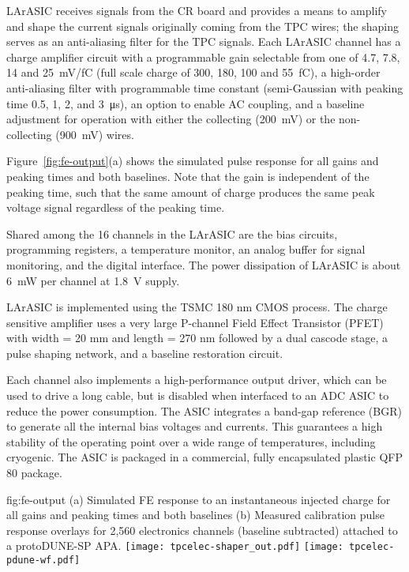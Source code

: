 
LArASIC receives signals from the CR board and
provides a means to amplify and shape the current signals originally coming from the TPC wires; the
shaping serves as an anti-aliasing filter for the TPC signals.
Each LArASIC channel has a charge amplifier circuit with a programmable
gain selectable from one of 4.7, 7.8, 14 and 25~mV/fC
(full scale charge of 300, 180, 100 and 55~fC),
a high-order anti-aliasing filter with programmable time
constant (semi-Gaussian with peaking time 0.5, 1, 2, and 3~\si{\micro\second}),
an option to enable AC coupling,
and a baseline adjustment for operation with either the collecting (200~mV) or the non-collecting (900~mV) wires.

Figure~\ref{fig:fe-output}(a) shows the simulated pulse response for all gains and peaking times and both baselines.
Note that the gain is independent of the peaking time, such that the same amount of charge produces the same peak voltage signal regardless of the peaking time.  

Shared among the 16 channels in the LArASIC are the bias circuits, programming registers,
a temperature monitor, an analog buffer for signal monitoring, and the digital interface.
The power dissipation of LArASIC is about 6~mW per channel at 1.8~V supply.

LArASIC is implemented using the TSMC 180 nm CMOS process.  The charge sensitive amplifier uses a very large P-channel Field Effect Transistor (PFET) with width = 20 mm and length = 270 nm followed by a dual cascode stage, a pulse shaping network, and a baseline restoration circuit.  

Each channel also implements a high-performance output driver,
which can be used to drive a long cable, but is disabled when interfaced to an ADC ASIC to reduce the power consumption.
The ASIC integrates a band-gap reference (BGR) to generate all the internal bias voltages and currents.
This guarantees a high stability of the operating point over a wide range of
temperatures, including cryogenic.
The ASIC is packaged in a commercial, fully encapsulated plastic QFP 80 package.

\begin{dunefigure}
{fig:fe-output}
{(a) Simulated FE response to an instantaneous injected charge for all gains and peaking times and both baselines (b) Measured calibration pulse response overlays for 2,560 electronics channels (baseline subtracted) attached to a protoDUNE-SP APA. }
\texttt{[image: tpcelec-shaper\_out.pdf]}
\texttt{[image: tpcelec-pdune-wf.pdf]}
\end{dunefigure}

